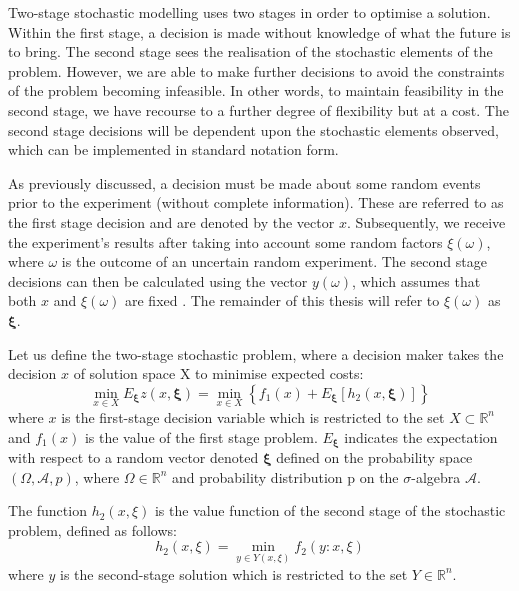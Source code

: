 \documentclass[../thesis.tex]{subfiles}
\begin{document}
Two-stage stochastic modelling uses two stages in order to optimise a solution. Within the first stage, a decision is made without knowledge of what the future is to bring. The second stage sees the realisation of the stochastic elements of the problem. However, we are able to make further decisions to avoid the constraints of the problem becoming infeasible. In other words, to maintain feasibility in the second stage, we have recourse to a further degree of flexibility but at a cost. The second stage decisions will be dependent upon the stochastic elements observed, which can be implemented in standard notation form.

As previously discussed, a decision must be made about some random events prior to the experiment (without complete information). These are referred to as the first stage decision and are denoted by the vector $x$. Subsequently, we receive the experiment's results after taking into account some random factors $\xi(\omega)$, where $\omega$ is the outcome of an uncertain random experiment. The second stage decisions can then be calculated using the vector $y(\omega)$, which assumes that both $x$ and $\xi(\omega)$ are fixed \cite{AndrasPrekopa1995,Birge2011,Ruszczynski2003}. The remainder of this thesis will refer to $\xi(\omega)$ as $\boldsymbol{\xi}$.


Let us define the two-stage stochastic problem, where a decision maker takes the decision $x$ of solution space X to minimise expected costs:
\begin{equation}\label{eq:firststage}
    \min _{x \in X} E_{\boldsymbol{\xi}} z(x, \boldsymbol{\xi})=\min _{x \in X}\left\{f_1(x)+E_{\boldsymbol{\xi}}\left[h_2(x, \boldsymbol{\xi})\right]\right\}
\end{equation}
where $x$ is the first-stage decision variable which is restricted to the set $X \subset \mathbb{R}^n$ and $f_{1}(x)$ is the value of the first stage problem. $E_{\boldsymbol{\xi}}$ indicates the expectation with respect to a random vector denoted $\boldsymbol{\xi}$ defined on the probability space $(\Omega, \mathscr{A}, p)$, where $\Omega \in \mathbb{R}^{n}$ and probability distribution p on the $\sigma$-algebra $\mathscr{A}$.

The function $h_2(x, \xi)$ is the value function of the second stage of the stochastic problem, defined as follows:
\begin{equation}\label{eq:secondstage}
    h_{2}(x,\xi) = \min_{y\in Y (x,\xi)} f_{2}(y:x,\xi)
\end{equation}
where $y$ is the second-stage solution which is restricted to the set $Y \in \mathbb{R}^{n}$. 
\end{document}
